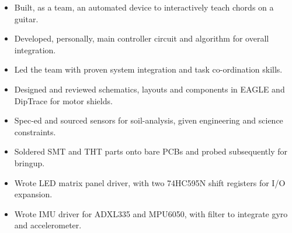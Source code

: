 \documentclass{resume}
\begin{document}

\begin{itemize}
  \item Built, as a team, an automated device to interactively teach chords on a guitar.
  \item Developed, personally, main controller circuit and algorithm for overall integration.
  \item Led the team with proven system integration and task co-ordination skills.
\end{itemize}

\begin{itemize}
  \item Designed and reviewed schematics, layouts and components in EAGLE and DipTrace for motor shields. %
  \item Spec-ed and sourced sensors for soil-analysis, given engineering and science constraints.
  \item Soldered SMT and THT parts onto bare PCBs and probed subsequently for bringup.
\end{itemize}

\begin{itemize}
  \item Wrote LED matrix panel driver, with two 74HC595N shift registers for I/O expansion.
  \item Wrote IMU driver for ADXL335 and MPU6050, with filter to integrate gyro and accelerometer.
\end{itemize}

\end{document}
